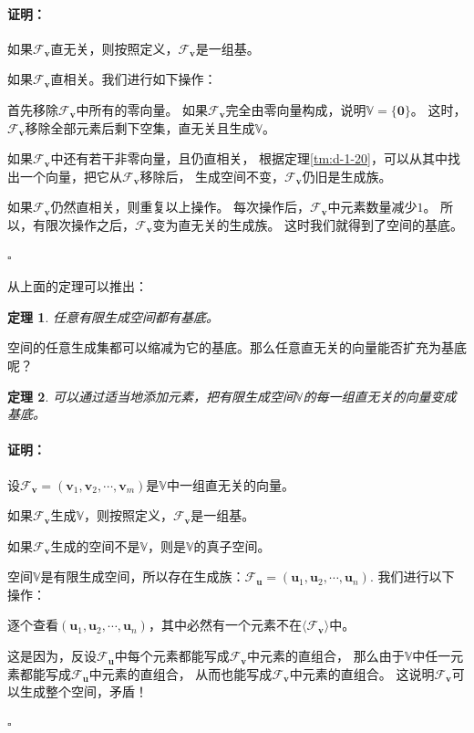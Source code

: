 \documentclass[12pt,UTF8]{ctexbook}
\renewenvironment{proof}{\paragraph{\textbf{证明：}}}{\hfill$\square$}
\newtheorem{tm}{定理}[section]
\begin{document}
\begin{appendix}
\begin{proof}
    如果$\mathcal{F}_{\mathbf{v}}$直无关，则按照定义，$\mathcal{F}_{\mathbf{v}}$是一组基。

    如果$\mathcal{F}_{\mathbf{v}}$直相关。我们进行如下操作：

    首先移除$\mathcal{F}_{\mathbf{v}}$中所有的零向量。
    如果$\mathcal{F}_{\mathbf{v}}$完全由零向量构成，说明$\mathbb{V} = \{\mathbf{0}\}$。
    这时，$\mathcal{F}_{\mathbf{v}}$移除全部元素后剩下空集，直无关且生成$\mathbb{V}$。

    如果$\mathcal{F}_{\mathbf{v}}$中还有若干非零向量，且仍直相关，
    根据定理\ref{tm:d-1-20}，可以从其中找出一个向量，把它从$\mathcal{F}_{\mathbf{v}}$移除后，
    生成空间不变，$\mathcal{F}_{\mathbf{v}}$仍旧是生成族。

    如果$\mathcal{F}_{\mathbf{v}}$仍然直相关，则重复以上操作。
    每次操作后，$\mathcal{F}_{\mathbf{v}}$中元素数量减少$1$。
    所以，有限次操作之后，$\mathcal{F}_{\mathbf{v}}$变为直无关的生成族。
    这时我们就得到了空间的基底。

\end{proof}

从上面的定理可以推出：
\begin{tm}\label{tm:d-1-50}
    任意有限生成空间都有基底。
\end{tm}

空间的任意生成集都可以缩减为它的基底。那么任意直无关的向量能否扩充为基底呢？
\begin{tm}\label{tm:d-1-60}
    可以通过适当地添加元素，把有限生成空间$\mathbb{V}$的每一组直无关的向量变成基底。
\end{tm}

\begin{proof}
    设$\mathcal{F}_{\mathbf{v}} = (\mathbf{v}_1, \mathbf{v}_2, \cdots , \mathbf{v}_m )$是$\mathbb{V}$中一组直无关的向量。

    如果$\mathcal{F}_{\mathbf{v}}$生成$\mathbb{V}$，则按照定义，$\mathcal{F}_{\mathbf{v}}$是一组基。

    如果$\mathcal{F}_{\mathbf{v}}$生成的空间不是$\mathbb{V}$，则是$\mathbb{V}$的真子空间。

    空间$\mathbb{V}$是有限生成空间，所以存在生成族：$\mathcal{F}_{\mathbf{u}} = (\mathbf{u}_1, \mathbf{u}_2, \cdots , \mathbf{u}_n )$. 我们进行以下操作：

    逐个查看$(\mathbf{u}_1, \mathbf{u}_2, \cdots , \mathbf{u}_n )$，其中必然有一个元素不在$\langle\mathcal{F}_{\mathbf{v}}\rangle$中。

    这是因为，反设$\mathcal{F}_{\mathbf{u}}$中每个元素都能写成$\mathcal{F}_{\mathbf{v}}$中元素的直组合，
    那么由于$\mathbb{V}$中任一元素都能写成$\mathcal{F}_{\mathbf{u}}$中元素的直组合，
    从而也能写成$\mathcal{F}_{\mathbf{v}}$中元素的直组合。
    这说明$\mathcal{F}_{\mathbf{v}}$可以生成整个空间，矛盾！


\end{proof}
\end{appendix}
\end{document}
